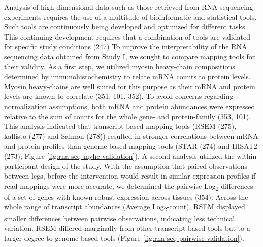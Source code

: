 \documentclass[twoside,10pt]{gihclass} %
\begin{document}
Analysis of high-dimensional data such as those retrieved from RNA sequencing experiments requires the use of a multitude of bioinformatic and statistical tools. Such tools are continuously being developed and optimized for different tasks. This continuing development requires that a combination of tools are validated for specific study conditions (247)
To improve the interpretability of the RNA sequencing data obtained from Study I, we sought to compare mapping tools for their validity. As a first step, we utilized myosin heavy-chain compositions determined by immunohistochemistry to relate mRNA counts to protein levels. Myosin heavy-chains are well suited for this purpose as their mRNA and protein levels are known to correlate
(351, 101, 352).
To avoid concerns regarding normalization assumptions, both mRNA and protein abundances were expressed relative to the sum of counts for the whole gene- and protein-family
(353, 101).
This analysis indicated that transcript-based mapping tools
(RSEM (275),
kallisto (277) and Salmon (278))
resulted in stronger correlations between mRNA and protein profiles than genome-based mapping tools
(STAR (274)
and HISAT2 (273); Figure \ref{fig:rna-seq-myhc-validation}).
A second analysis utilized the within-participant design of the study. With the assumption that paired observations between legs, before the intervention would result in similar expression profiles if read mappings were more accurate, we determined the pairwise Log\textsubscript{2}-differences of a set of genes with known robust expression across tissues (354).
Across the whole range of transcript abundances (Average Log\textsubscript{2}-count), RSEM displayed smaller differences between pairwise observations, indicating less technical variation. RSEM differed marginally from other transcript-based tools but to a larger degree to genome-based tools (Figure \ref{fig:rna-seq-pairwise-validation}).
\end{document}
